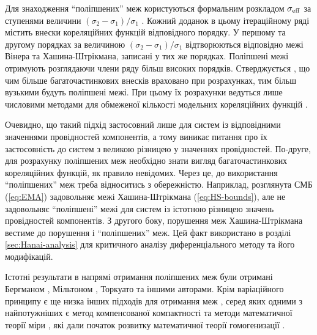 \documentclass[14pt,twoside]{vakthesis}
\begin{document}
Для знаходження ``поліпшених'' меж користуються формальним розкладом $\sigma_{\rm eff}$ за ступенями величини $(\sigma_2-\sigma_1)/\sigma_1$ \cite{Torquato1991,Torquato}. Кожний доданок в цьому ітераційному ряді містить внески кореляційних функцій відповідного порядку. У першому та другому порядках за величиною $(\sigma_2-\sigma_1)/\sigma_1$ відтворюються відповідно межі Вінера та Хашина-Штрікмана, записані у тих же порядках. Поліпшені межі отримують розглядаючи члени ряду більш високих порядків.  Стверджується \cite{Torquato}, що чим більше багаточастинкових внесків враховано при розрахунках, тим більш вузькими будуть поліпшені межі. При цьому їх розрахунки ведуться лише числовими методами для обмеженої кількості модельних кореляційних функцій \cite{Cule1999}. 

Очевидно, що такий підхід застосовний лише для систем із відповідними значеннями провідностей компонентів, а тому виникає питання про їх застосовність до систем з великою різницею у значеннях провідностей. По-друге, для розрахунку поліпшених меж необхідно знати вигляд багаточастинкових кореляційних функцій, як правило невідомих. 
Через це, до використання ``поліпшених'' меж треба відноситись з обережністю. 
Наприклад, розглянута СМБ (\ref{eq:EMA}) задовольняє межі Хашина-Штрік\-мана (\ref{eq:HS-bounds}), але не задовольняє ``поліпшені'' межі \cite{Torquato} для систем із істотною різницею значень провідностей компонентів. З другого боку, порушення меж Хашина-Штрікмана вестиме до порушення і ``поліпшених'' меж. Цей факт використано в розділі \ref{sec:Hanai-analysis} для критичного аналізу диференціального методу та його модифікацій.

Істотні результати в напрямі отримання поліпшених меж були отримані Бергманом \cite{Bergman1978,Bergman1992}, Мільтоном \cite{Milton}, Торкуато \cite{Torquato1991,Torquato} та іншими авторами. Крім варіаційного принципу є ще низка інших підходів для отримання меж \cite{Milton,Torquato,Sihvola1999,Cioranescu,Jikov}, серед яких одними з найпотужніших є метод компенсованої компактності \cite{Tartar1979,Milton} та методи математичної теорії міри  \cite{Tartar1990}, які дали початок розвитку математичної теорії гомогенизації \cite{Cioranescu,Jikov}.
\end{document}
